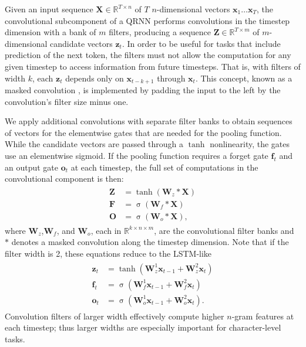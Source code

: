 \documentclass{article} %
\DeclareMathOperator*{\sigmoid}{\sigma}
\begin{document}
Given an input sequence $\mathbf{X}\in\mathbb{R}^{T\times n}$ of $T$ $n$-dimensional vectors $\mathbf{x}_1\ldots\mathbf{x}_T$, the convolutional subcomponent of a QRNN performs convolutions in the timestep dimension with a bank of $m$ filters, producing a sequence $\mathbf{Z}\in\mathbb{R}^{T\times m}$ of $m$-dimensional candidate vectors $\mathbf{z}_t$. In order to be useful for tasks that include prediction of the next token, the filters must not allow the computation for any given timestep to access information from future timesteps. That is, with filters of width $k$, each $\mathbf{z}_t$ depends only on $\mathbf{x}_{t-k+1}$ through $\mathbf{x}_t$. This concept, known as a masked convolution \citep{vandenOord2016}, is implemented by padding the input to the left by the convolution's filter size minus one.

We apply additional convolutions with separate filter banks to obtain sequences of vectors for the elementwise gates that are needed for the pooling function. While the candidate vectors are passed through a $\tanh$ nonlinearity, the gates use an elementwise sigmoid. If the pooling function requires a forget gate $\mathbf{f}_t$ and an output gate $\mathbf{o}_t$ at each timestep, the full set of computations in the convolutional component is then:
\begin{align}
\begin{split}\label{conv}
\mathbf{Z}&=\tanh(\mathbf{W}_z*\mathbf{X})\\
\mathbf{F}&=\sigmoid(\mathbf{W}_f*\mathbf{X})\\
\mathbf{O}&=\sigmoid(\mathbf{W}_o*\mathbf{X}),
\end{split}
\end{align}
where $\mathbf{W}_z$,$\mathbf{W}_f$, and $\mathbf{W}_o$, each in $\mathbb{R}^{k\times n\times m}$, are the convolutional filter banks and $*$ denotes a masked convolution along the timestep dimension. Note that if the filter width is 2, these equations reduce to the LSTM-like
\begin{align}
\begin{split}\label{lstm-like}
\mathbf{z}_t&=\tanh(\mathbf{W}^1_z\mathbf{x}_{t-1}+\mathbf{W}^2_z\mathbf{x}_t)\\
\mathbf{f}_t&=\sigmoid(\mathbf{W}^1_f\mathbf{x}_{t-1}+\mathbf{W}^2_f\mathbf{x}_t)\\
\mathbf{o}_t&=\sigmoid(\mathbf{W}^1_o\mathbf{x}_{t-1}+\mathbf{W}^2_o\mathbf{x}_t).
\end{split}
\end{align}
Convolution filters of larger width effectively compute higher $n$-gram features at each timestep; thus larger widths are especially important for character-level tasks.
\end{document}

